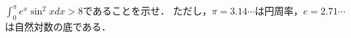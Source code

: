 \documentclass[../../main.tex]{subfiles}
\begin{document}
$\displaystyle\int_0^\pi e^x {\sin}^2x dx>8$であることを示せ．
ただし，$\pi=3.14\cdots$は円周率，$e=2.71\cdots$は自然対数の底である．
\end{document}
